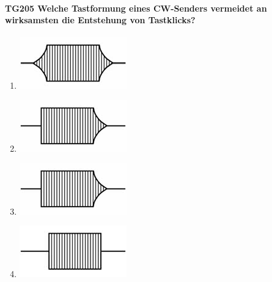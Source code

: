 \documentclass[8pt]{article}
\begin{document}
\paragraph*{TG205 Welche Tastformung eines CW-Senders vermeidet an wirksamsten die Entstehung von Tastklicks?}
\begin{enumerate}[nolistsep,label=\Alph*]
\item
\begin{center}
	\begin{minipage}{\linewidth}
		\centering
		\includegraphics[scale=1.0]{pics/tg205_a.jpg}
	\end{minipage}
\end{center}
\item
\begin{center}
	\begin{minipage}{\linewidth}
		\centering
		\includegraphics[scale=1.0]{pics/tg205_b.jpg}
	\end{minipage}
\end{center}
\item
\begin{center}
	\begin{minipage}{\linewidth}
		\centering
		\includegraphics[scale=1.0]{pics/tg205_c.jpg}
	\end{minipage}
\end{center}
\item
\begin{center}
	\begin{minipage}{\linewidth}
		\centering
		\includegraphics[scale=1.0]{pics/tg205_d.jpg}
	\end{minipage}
\end{center}
\end{enumerate}
\end{document}
